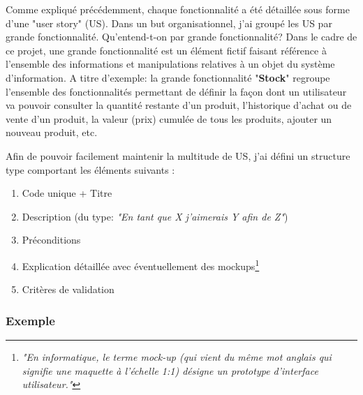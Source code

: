 Comme expliqué précédemment, chaque fonctionnalité a été détaillée sous forme d'une "user story" (US). Dans un but organisationnel, j'ai groupé les US par grande fonctionnalité. Qu'entend-t-on par grande fonctionnalité? Dans le cadre de ce projet, une grande fonctionnalité est un élément fictif faisant référence à l'ensemble des informations et manipulations relatives à un objet du système d'information. A titre d'exemple: la grande fonctionnalité "\textbf{Stock}" regroupe l'ensemble des fonctionnalités permettant de définir la façon dont un utilisateur va pouvoir consulter la quantité restante d'un produit, l'historique d'achat ou de vente d'un produit, la valeur (prix) cumulée de tous les produits, ajouter un nouveau produit, etc. 

\newpara

Afin de pouvoir facilement maintenir la multitude de US, j'ai défini un structure type comportant les éléments suivants :
\begin{enumerate}
  \item Code unique + Titre
  \item Description (du type: \textit{"En tant que X j'aimerais Y afin de Z"})
  \item Préconditions
  \item Explication détaillée avec éventuellement des mockups\footnote{\textit{"En informatique, le terme mock-up (qui vient du même mot anglais qui signifie une maquette à l'échelle 1:1) désigne un prototype d'interface utilisateur."}\cite{Mock}}
  \item Critères de validation
\end{enumerate}

\newpage

\subsubsection{Exemple}

